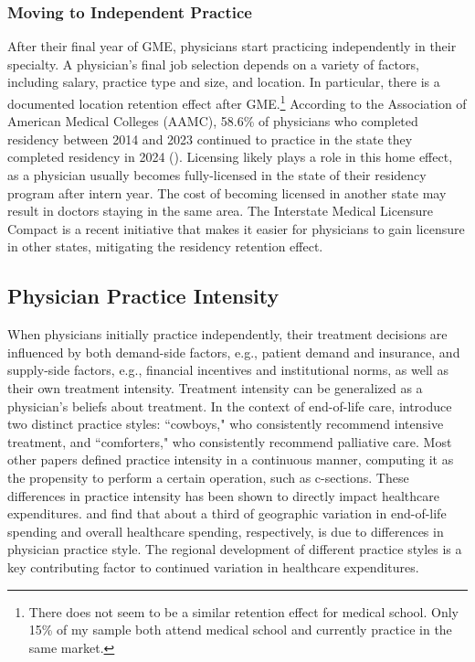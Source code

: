 \subsubsection{Moving to Independent Practice}
After their final year of GME, physicians start practicing independently in their specialty. A physician's final job selection depends on a variety of factors, including salary, practice type and size, and location. In particular, there is a documented location retention effect after GME.\footnote{There does not seem to be a similar retention effect for medical school. Only 15\% of my sample both attend medical school and currently practice in the same market.} According to the Association of American Medical Colleges (AAMC), 58.6\% of physicians who completed residency between 2014 and 2023 continued to practice in the state they completed residency in 2024 (\cite{noauthor_table_nodate}). Licensing likely plays a role in this home effect, as a physician usually becomes fully-licensed in the state of their residency program after intern year. The cost of becoming licensed in another state may result in doctors staying in the same area. The Interstate Medical Licensure Compact is a recent initiative that makes it easier for physicians to gain licensure in other states, mitigating the residency retention effect. 

\subsection{Physician Practice Intensity}
When physicians initially practice independently, their treatment decisions are influenced by both demand-side factors, e.g., patient demand and insurance, and supply-side factors, e.g., financial incentives and institutional norms, as well as their own treatment intensity. Treatment intensity can be generalized as a physician's beliefs about treatment. In the context of end-of-life care, \textcite{cutler2019} introduce two distinct practice styles: ``cowboys," who consistently recommend intensive treatment, and ``comforters," who consistently recommend palliative care. Most other papers defined practice intensity in a continuous manner, computing it as the propensity to perform a certain operation, such as c-sections. These differences in practice intensity has been shown to directly impact healthcare expenditures. \textcite{cutler2019} and \textcite{badinski2023} find that about a third of geographic variation in end-of-life spending and overall healthcare spending, respectively, is due to differences in physician practice style. The regional development of different practice styles is a key contributing factor to continued variation in healthcare expenditures. 


